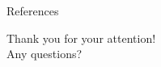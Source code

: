 \documentclass{beamer}
\begin{document}
\begin{frame}{References}
\printbibliography
\end{frame}

\begin{frame}
\centering
\Large Thank you for your attention! \\
\vspace{1cm}
Any questions?
\end{frame}
\end{document}

